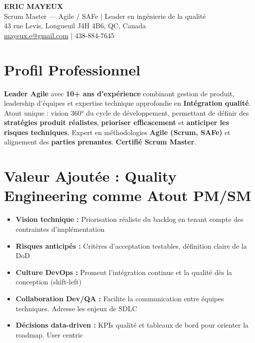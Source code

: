 \documentclass[11pt,a4paper]{article}
\newcommand{\highlight}[1]{\textcolor{primaryblue}{\textbf{#1}}}
\newcommand{\keypoint}[1]{\textbf{#1}}
\begin{document}
\begin{center}
    {\LARGE \textbf{ERIC MAYEUX}}\\
    \vspace{2pt}
    {\normalsize Scrum Master — Agile / SAFe | Leader en ingénierie de la qualité}\\
    \vspace{3pt}
    43 rue Levis, Longueuil J4H 4B6, QC, Canada\\
    \href{mailto:mayeux.e@gmail.com}{mayeux.e@gmail.com} | 438-884-7645
\end{center}

\vspace{6pt}

\section*{Profil Professionnel}
\noindent
\highlight{Leader Agile} avec \keypoint{10+ ans d'expérience} combinant gestion de produit, leadership d'équipes et expertise technique approfondie en \highlight{Intégration qualité}. Atout unique : vision 360° du cycle de développement, permettant de définir des \highlight{stratégies produit réalistes}, \highlight{prioriser efficacement} et \highlight{anticiper les risques techniques}. Expert en méthodologies \highlight{Agile (Scrum, SAFe)} et alignement des \highlight{parties prenantes}. \highlight{Certifié Scrum Master}. 


\section*{Valeur Ajoutée : Quality Engineering comme Atout PM/SM}
\begin{itemize}[leftmargin=10pt]
    \item \highlight{Vision technique :} Priorisation réaliste du backlog en tenant compte des contraintes d'implémentation
    \item \highlight{Risques anticipés :} Critères d'acceptation testables, définition claire de la DoD
    \item \highlight{Culture DevOps :} Promeut l'intégration continue et la qualité dès la conception (shift-left)
    \item \highlight{Collaboration Dev/QA :} Facilite la communication entre équipes techniques. Adresse les enjeux de SDLC
    \item \highlight{Décisions data-driven :} KPIs qualité et tableaux de bord pour orienter la roadmap. User centric
\end{itemize}
\end{document}
